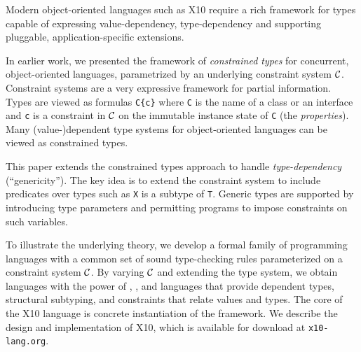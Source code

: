 Modern object-oriented languages such as X10 require a rich framework
for types capable of expressing value-dependency, type-dependency
and supporting pluggable, application-specific extensions.

In earlier work, we presented the framework of \emph{constrained
types} for concurrent, object-oriented languages, parametrized by
an underlying constraint system $\cal C$. Constraint systems are a
very expressive framework for partial information. Types are viewed
as formulas \texttt{C\{c\}} where \texttt{C} is the name of a class
or an interface and \texttt{c} is a constraint in $\cal C$ on the
immutable instance state of \texttt{C} (the \emph{properties}).
Many (value-)dependent type systems for object-oriented languages
can be viewed as constrained types.

This paper extends the constrained types approach to handle
\emph{type-dependency} (``genericity''). The key idea is to extend
the constraint system to include predicates over types such as
\texttt{X} is a subtype of \texttt{T}.  Generic types are supported
by introducing type parameters and permitting programs to impose
constraints on such variables.

To illustrate the underlying theory, we develop a formal family of
programming languages with a common set of sound type-checking rules
parameterized on a constraint system $\cal C$.  By varying $\cal
C$ and extending the type system, we obtain languages with the power
of \FJ, \FGJ, and languages that provide dependent types, structural
subtyping, and constraints that relate values and types.  The core
of the X10 language is concrete instantiation of the framework.  We
describe the design and implementation of X10, which is available
for download at \texttt{x10-lang.org}.

